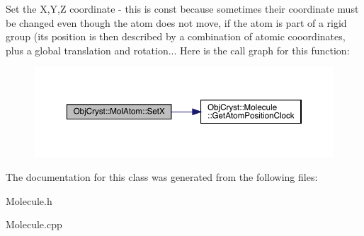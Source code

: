 Set the X,Y,Z coordinate -\/ this is const because sometimes their coordinate must be changed even though the atom does not move, if the atom is part of a rigid group (its position is then described by a combination of atomic cooordinates, plus a global translation and rotation... Here is the call graph for this function\+:
\nopagebreak
\begin{figure}[H]
\begin{center}
\leavevmode
\includegraphics[width=350pt]{class_obj_cryst_1_1_mol_atom_a95340ae3d8e3d061a9c28911d471912d_cgraph}
\end{center}
\end{figure}


The documentation for this class was generated from the following files\+:\begin{DoxyCompactItemize}
\item 
Molecule.\+h\item 
Molecule.\+cpp\end{DoxyCompactItemize}
